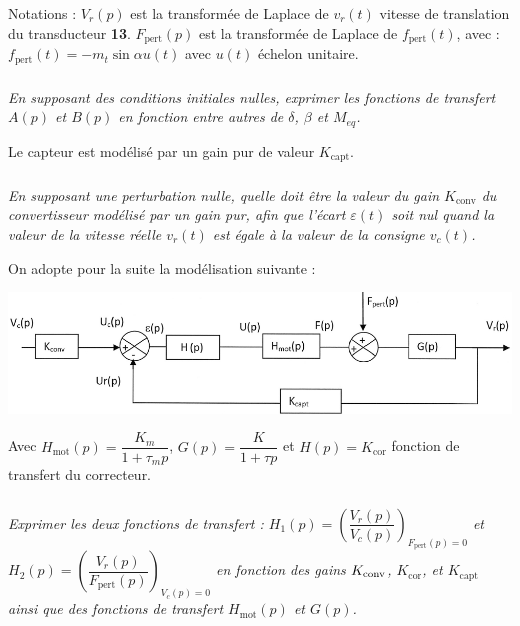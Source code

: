 \documentclass[10pt,fleqn]{article} %
\begin{document}
\begin{multicols}{2}
Notations : $V_r(p)$ est la transformée de Laplace de $v_r(t)$ vitesse de translation du transducteur \textbf{13}.
$F_{\text{pert}}(p)$ est la transformée de Laplace de $f_{\text{pert}}(t)$, avec :
$f_{\text{pert}}(t) = -m_t  \sin \alpha u(t)$ avec $u(t)$ échelon unitaire.


\subparagraph{}
\textit{En supposant des conditions initiales nulles, exprimer les fonctions de transfert $A(p)$ et $B(p)$ en fonction entre autres de $\delta$, $\beta$ et $M_{eq}$.
}
\ifprof
\begin{corrige}
\end{corrige}
\else
\fi

\vspace{.25cm}
Le capteur est modélisé par un gain pur de valeur $K_{\text{capt}}$.


\subparagraph{}
\textit{En supposant une perturbation nulle, quelle doit être la valeur du gain $K_{\text{conv}}$ du convertisseur modélisé par un gain pur, afin que l’écart $\varepsilon(t)$ soit nul quand la valeur de la vitesse réelle $v_r(t)$ est égale à la valeur de la consigne $v_c(t)$. 
}
\ifprof
\begin{corrige}
\end{corrige}
\else
\fi

\vspace{.25cm}
On adopte pour la suite la modélisation suivante :

\begin{center}
	\includegraphics[width=\linewidth]{images/fig_14}
\end{center}

Avec $H_{\text{mot}}(p)=\dfrac{K_m}{1+\tau_m p}$, $G(p)=\dfrac{K}{1+\tau p}$ et $H(p)=K_{\text{cor}}$ fonction de transfert du correcteur.


\subparagraph{}
\textit{Exprimer les deux fonctions de transfert : $H_1(p)=\left(\dfrac{V_r(p)}{V_c(p)} \right)_{F_{\text{pert}}(p)=0}$ et $H_2(p)=\left(\dfrac{V_r(p)}{F_{\text{pert}}(p)} \right)_{V_c(p)=0}$ en fonction des gains $K_\text{\text{conv}}$, $K_{\text{cor}}$, et $K_{\text{capt}}$ ainsi que des fonctions de transfert $H_{\text{mot}}(p)$ et $G(p)$.}
\ifprof
\begin{corrige}
\end{corrige}
\else
\fi



\end{multicols}
\end{document}
